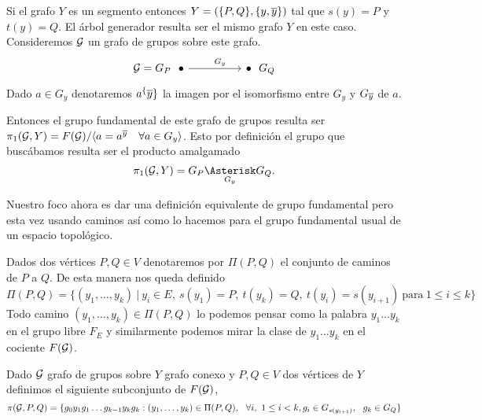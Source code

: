 \documentclass[tesis.tex]{subfiles}
\begin{document}
\begin{ej}\label{ej_pi1_segmento}
	
	Si el grafo $Y$ es un segmento entonces $Y = (\{ P,Q \}, \{ y, \overline y\})$ tal que $s(y) = P$ y $t(y) = Q$.
	El árbol generador resulta ser el mismo grafo $Y$ en este caso.
	Consideremos ${\cal G}$ un grafo de grupos sobre este grafo.
	\[\begin{tikzcd}
		\cG = {G_P \ \ \bullet} && {\bullet \ \ G_Q}
		\arrow["G_y"{pos=0.6}, from=1-1, to=1-3]
	\end{tikzcd}\]
	Dado $a \in G_{y}$ denotaremos $a^\{\overline y\}$ la imagen por el isomorfismo entre $G_{y}$ y $G_{\overline y}$ de $a$.
	
	Entonces el grupo fundamental de este grafo de grupos resulta ser 
	$\pi_1({\cal G}, Y) =  F({\cal G}) / \langle a = a^{\overline y} \quad \forall a \in G_{y} \rangle$.
	Esto por definición el grupo que buscábamos resulta ser el producto amalgamado
	\[
	\pi_1({\cal G}, Y) = G_P \underset{G_{y}}{\Asterisk} G_Q.
	\]
\end{ej}

Nuestro foco ahora es dar una definición equivalente de grupo fundamental pero esta vez usando caminos así como lo hacemos para el grupo fundamental usual de un espacio topológico.

\medskip
Dados dos vértices $P,Q \in V$ denotaremos por $\Pi(P,Q)$ el conjunto de caminos de $P$ a $Q$.
De esta manera nos queda definido
\[
\Pi(P,Q) = \{  (y_1, \dots, y_k) \ | \ y_{i} \in E, \ s(y_1)=P, \ t(y_k) = Q, \ t(y_i) = s(y_{i+1})  \ \text{para} \ 1 \le i \le k \}
\]
Todo camino $(y_1, \dots, y_k) \in \Pi(P,Q)$ lo podemos pensar como la palabra $y_1 \dots y_k$ en el grupo libre $F_E$ y similarmente podemos mirar la clase de $y_1\dots y_k$ en el cociente $F({\cal G})$.  

\begin{deff}
	Dado ${\cal G}$ grafo de grupos sobre $Y$ grafo conexo y $P,Q \in V$ dos vértices de $Y$ definimos el siguiente subconjunto de $F({\cal G})$,
	\begin{equation*}
		\pi(\cG, P, Q) = \{  g_0y_1g_1 \dots g_{k-1}y_kg_k : (y_1,\dots, y_k) \in \Pi(P,Q), \ \ 
		 \forall i, \ 1 \le i < k, g_i \in G_{s(y_{i+1})}, \ \ g_k \in G_Q \}	
	\end{equation*}
\end{deff}
 
\end{document}
